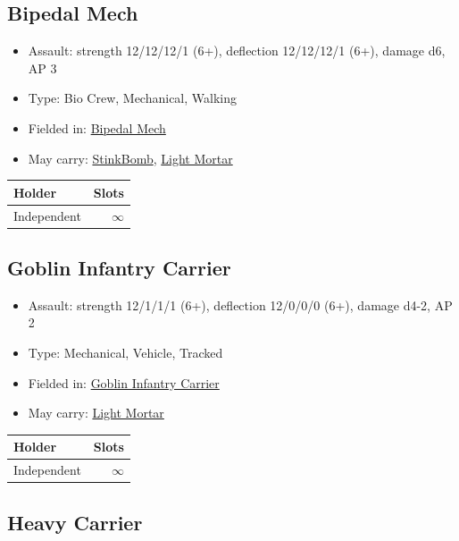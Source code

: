 \documentclass[a4paper,12pt]{article}
\begin{document}
\subsection{Bipedal Mech}
\label{model-bipedal-mech}

\begin{itemize}
\item Assault: strength 12/12/12/1 (6+), deflection 12/12/12/1 (6+), damage d6, AP 3
\item Type: Bio Crew, Mechanical, Walking
\item Fielded in: \hyperref[unit-bipedal-mech]{Bipedal Mech}
\item May carry: \hyperref[equipment-stinkbomb]{StinkBomb}, \hyperref[equipment-light-mortar]{Light Mortar}




\end{itemize}

\begin{tabular}{lr}
\textbf{Holder} & \textbf{Slots} \\
\hline
Independent & $\infty$ \\
\end{tabular}
\vspace{1ex}
\subsection{Goblin Infantry Carrier}
\label{model-goblin-infantry-carrier}

\begin{itemize}
\item Assault: strength 12/1/1/1 (6+), deflection 12/0/0/0 (6+), damage d4-2, AP 2
\item Type: Mechanical, Vehicle, Tracked
\item Fielded in: \hyperref[unit-goblin-infantry-carrier]{Goblin Infantry Carrier}
\item May carry: \hyperref[equipment-light-mortar]{Light Mortar}




\end{itemize}

\begin{tabular}{lr}
\textbf{Holder} & \textbf{Slots} \\
\hline
Independent & $\infty$ \\
\end{tabular}
\vspace{1ex}
\subsection{Heavy Carrier}
\label{model-heavy-carrier}
\end{document}

